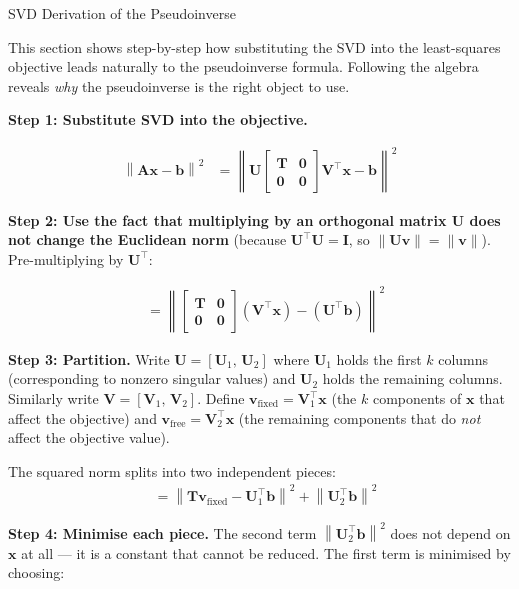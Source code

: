 \documentclass[aspectratio=169,10pt]{beamer}
\newcommand{\bx}{\mathbf{x}}
\newcommand{\bb}{\mathbf{b}}
\newcommand{\bA}{\mathbf{A}}
\newcommand{\bU}{\mathbf{U}}
\newcommand{\bV}{\mathbf{V}}
\newcommand{\bT}{\mathbf{T}}
\newcommand{\norm}[1]{\left\|#1\right\|}
\begin{document}
\begin{frame}[allowframebreaks]{SVD Derivation of the Pseudoinverse}

  This section shows step-by-step how substituting the SVD into the least-squares
  objective leads naturally to the pseudoinverse formula.  Following the algebra
  reveals \emph{why} the pseudoinverse is the right object to use.

  \textbf{Step 1: Substitute SVD into the objective.}

  \begin{align}
    \norm{\bA\bx - \bb}^2
    &= \left\|\bU\begin{bmatrix}\bT&\mathbf{0}\\\mathbf{0}&\mathbf{0}\end{bmatrix}
       \bV^{\top}\bx - \bb\right\|^2 \tag{13.6}
  \end{align}

  \textbf{Step 2: Use the fact that multiplying by an orthogonal matrix
  $\bU$ does not change the Euclidean norm} (because $\bU^{\top}\bU = \mathbf{I}$,
  so $\|\bU\mathbf{v}\| = \|\mathbf{v}\|$).  Pre-multiplying by $\bU^{\top}$:

  \begin{align}
    &= \left\|\begin{bmatrix}\bT&\mathbf{0}\\\mathbf{0}&\mathbf{0}\end{bmatrix}
       (\bV^{\top}\bx) - (\bU^{\top}\bb)\right\|^2 \tag{13.8}
  \end{align}

  \textbf{Step 3: Partition.}  Write $\bU = [\bU_1,\, \bU_2]$ where $\bU_1$ holds
  the first $k$ columns (corresponding to nonzero singular values) and $\bU_2$ holds
  the remaining columns.  Similarly write $\bV = [\bV_1,\, \bV_2]$.  Define
  $\mathbf{v}_{\text{fixed}} = \bV_1^{\top}\bx$ (the $k$ components of $\bx$
  that affect the objective) and $\mathbf{v}_{\text{free}} = \bV_2^{\top}\bx$
  (the remaining components that do \emph{not} affect the objective value).

  The squared norm splits into two independent pieces:
  \begin{align}
    &= \norm{\bT\mathbf{v}_{\text{fixed}} - \bU_1^{\top}\bb}^2
       + \norm{\bU_2^{\top}\bb}^2 \tag{13.11}
  \end{align}

  \framebreak

  \textbf{Step 4: Minimise each piece.}  The second term $\norm{\bU_2^{\top}\bb}^2$
  does not depend on $\bx$ at all --- it is a constant that cannot be reduced.
  The first term is minimised by choosing:


\end{frame}
\end{document}
